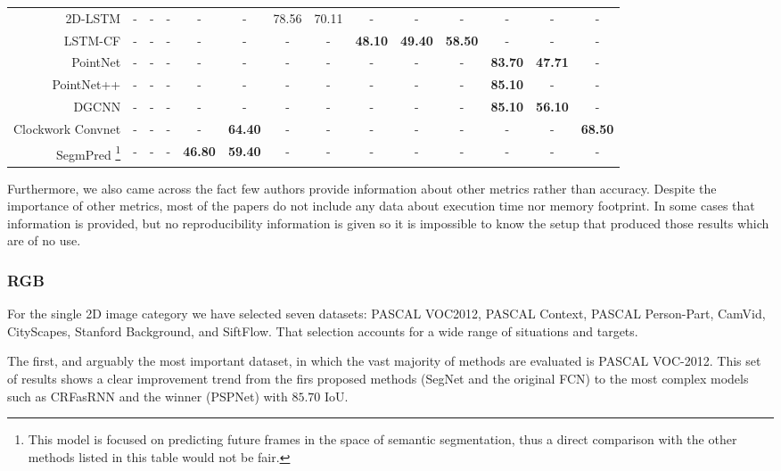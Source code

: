 \begin{table}[!htb]
{\begin{tabular}{|r|c|c|c|c|c|c|c|||c|c|c|||c|c|||c|}
    2D-LSTM\cite{Byeon2015} & - & - & - & - & - & 78.56 & 70.11 & - & - & - & - & - & - \\
    \acs{LSTM-CF}\cite{Li2016b} & - & - & - & - & - & - & - & \textbf{48.10} & \textbf{49.40} & \textbf{58.50} & - & - & - \\
    PointNet\cite{Qi2016} & - & - & - & - & - & - & - & - & - & - & \textbf{83.70} & \textbf{47.71} & -\\
    PointNet++\cite{Qi2017} & - & - & - & - & - & - & - & - & - & - & \textbf{85.10} & - & -\\
    \ac{DGCNN}\cite{Wang2018} & - & - & - & - & - & - & - & - & - & - & \textbf{85.10} & \textbf{56.10} & -\\
    Clockwork Convnet\cite{Shelhamer2016} & - & - & - & - & \textbf{64.40} & - & - & - & - & - & - & - & \textbf{68.50} \\
    SegmPred \cite{Luc2017} \footnote{This model is focused on predicting future frames in the space of semantic segmentation, thus a direct comparison with the other methods listed in this table would not be fair.} & - & - & - & \textbf{46.80} & \textbf{59.40} & - & - & - & - & - & - & - & - \\
    \hline
  \end{tabular}}
\end{table}

Furthermore, we also came across the fact few authors provide information about other metrics rather than accuracy. Despite the importance of other metrics, most of the papers do not include any data about execution time nor memory footprint. In some cases that information is provided, but no reproducibility information is given so it is impossible to know the setup that produced those results which are of no use.

\subsubsection{\acs{RGB}}

For the single \acs{2D} image category we have selected seven datasets: PASCAL \acs{VOC}2012, PASCAL Context, PASCAL Person-Part, CamVid, CityScapes, Stanford Background, and SiftFlow. That selection accounts for a wide range of situations and targets.

The first, and arguably the most important dataset, in which the vast majority of methods are evaluated is PASCAL \acs{VOC}-2012. This set of results shows a clear improvement trend from the firs proposed methods (SegNet and the original \acs{FCN}) to the most complex models such as \acs{CRF}as\acs{RNN} and the winner (\acs{PSPNet}) with $85.70$ \acs{IoU}.

